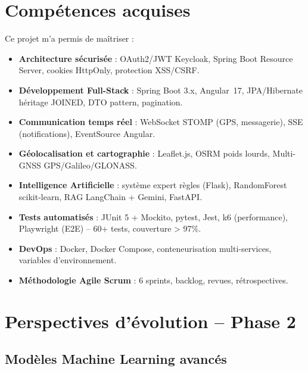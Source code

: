 \documentclass[12pt,a4paper]{report}
\begin{document}
\section{Compétences acquises}
\label{sec:ch10-competences}

Ce projet m'a permis de maîtriser :

\begin{itemize}
  \item \textbf{Architecture sécurisée} : OAuth2/JWT Keycloak, Spring Boot
        Resource Server, cookies HttpOnly, protection XSS/CSRF.
  \item \textbf{Développement Full-Stack} : Spring Boot 3.x, Angular~17,
        JPA/Hibernate héritage JOINED, DTO pattern, pagination.
  \item \textbf{Communication temps réel} : WebSocket STOMP (GPS, messagerie),
        SSE (notifications), EventSource Angular.
  \item \textbf{Géolocalisation et cartographie} : Leaflet.js, OSRM poids lourds,
        Multi-GNSS GPS/Galileo/GLONASS.
  \item \textbf{Intelligence Artificielle} : système expert règles (Flask),
        RandomForest scikit-learn, RAG LangChain + Gemini, FastAPI.
  \item \textbf{Tests automatisés} : JUnit 5 + Mockito, pytest, Jest,
        k6 (performance), Playwright (E2E) -- 60+ tests, couverture > 97\%.
  \item \textbf{DevOps} : Docker, Docker Compose, conteneurisation
        multi-services, variables d'environnement.
  \item \textbf{Méthodologie Agile Scrum} : 6 sprints, backlog,
        revues, rétrospectives.
\end{itemize}

\section{Perspectives d'évolution -- Phase 2}
\label{sec:ch10-perspectives}

\subsection{Modèles Machine Learning avancés}
\end{document}
